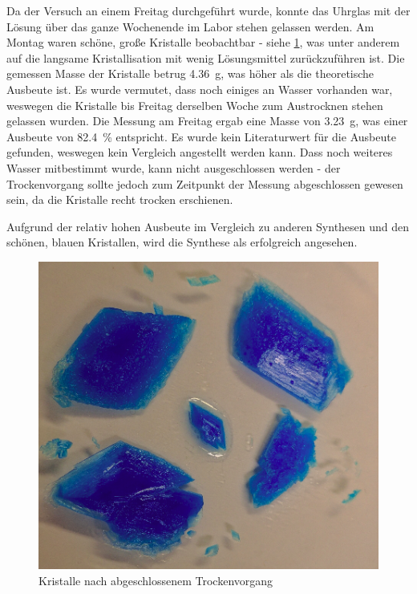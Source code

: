 \documentclass{article}
\begin{document}
      Da der Versuch an einem Freitag durchgeführt wurde, konnte das Uhrglas mit der  Lösung über das ganze Wochenende im Labor stehen gelassen werden. Am Montag waren schöne, große Kristalle beobachtbar - siehe \ref{fig:Kristalle}, was unter anderem auf die langsame Kristallisation mit wenig Lösungsmittel zurückzuführen ist. Die gemessen Masse der Kristalle betrug \SI[mode=text]{4.36}{\gram}, was höher als die theoretische Ausbeute ist. Es wurde vermutet, dass noch einiges an Wasser vorhanden war, weswegen die Kristalle bis Freitag derselben Woche zum Austrocknen stehen gelassen wurden. Die Messung am Freitag ergab eine Masse von \SI[mode=text]{3.23}{\gram}, was einer Ausbeute von \SI[mode=text]{82.4}{\percent} entspricht. Es wurde kein Literaturwert für die Ausbeute gefunden, weswegen kein Vergleich angestellt werden kann. Dass noch weiteres Wasser mitbestimmt wurde, kann nicht ausgeschlossen werden - der Trockenvorgang sollte jedoch zum Zeitpunkt der Messung abgeschlossen gewesen sein, da die Kristalle recht trocken erschienen.
      
      Aufgrund der relativ hohen Ausbeute im Vergleich zu anderen Synthesen und den schönen, blauen Kristallen, wird die Synthese als erfolgreich angesehen. 
      
      \begin{figure}[h]
      \includegraphics[scale=0.4, center]{Graphiken/Versuchsanordnungen/Kristalle.png} 
      \caption[synthetisierte Kristalle, Quelle: Autor]{Kristalle nach abgeschlossenem Trockenvorgang}
      \label{fig:Kristalle}
    \end{figure}
      
\end{document}
